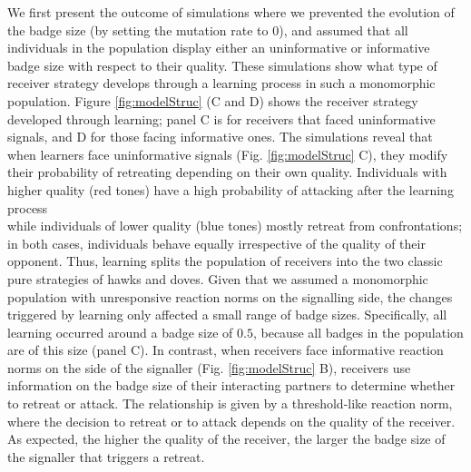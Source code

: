\documentclass[
  12pt,
]{article}
\begin{document}
We first present the outcome of simulations where we prevented the
evolution of the badge size (by setting the mutation rate to \(0\)), and
assumed that all individuals in the population display either an
uninformative or informative badge size with respect to their quality.
These simulations show what type of receiver strategy develops through a
learning process in such a monomorphic population. Figure
\ref{fig:modelStruc} (C and D) shows the receiver strategy developed
through learning; panel C is for receivers that faced uninformative
signals, and D for those facing informative ones. The simulations reveal
that when learners face uninformative signals (Fig. \ref{fig:modelStruc}
C), they modify their probability of retreating depending on their own
quality. Individuals with higher quality (red tones) have a high
probability of attacking after the learning process\\
while individuals of lower quality (blue tones) mostly retreat from
confrontations; in both cases, individuals behave equally irrespective
of the quality of their opponent. Thus, learning splits the population
of receivers into the two classic pure strategies of hawks and doves.
Given that we assumed a monomorphic population with unresponsive
reaction norms on the signalling side, the changes triggered by learning
only affected a small range of badge sizes. Specifically, all learning
occurred around a badge size of \(0.5\), because all badges in the
population are of this size (panel C). In contrast, when receivers face
informative reaction norms on the side of the signaller (Fig.
\ref{fig:modelStruc} B), receivers use information on the badge size of
their interacting partners to determine whether to retreat or attack.
The relationship is given by a threshold-like reaction norm, where the
decision to retreat or to attack depends on the quality of the receiver.
As expected, the higher the quality of the receiver, the larger the
badge size of the signaller that triggers a retreat.
\end{document}
